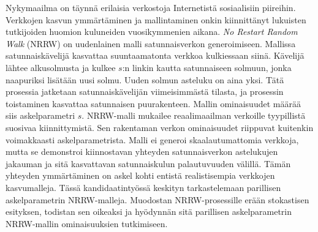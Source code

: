 \documentclass[finnish, 12pt, a4paper, sci, utf8, pdfa]{aaltothesis}
\date{12.5.2018}
\begin{document}
	
\makecoverpage

\makecopyrightpage

\begin{abstractpage}[finnish]
Nykymaailma on täynnä erilaisia verkostoja Internetistä sosiaalisiin piireihin. Verkkojen kasvun ymmärtäminen ja mallintaminen
onkin kiinnittänyt lukuisten tutkijoiden huomion kuluneiden vuosikymmenien aikana.
\textit{No Restart Random Walk} (NRRW) on uudenlainen malli satunnaisverkon generoimiseen. Mallissa satunnaiskävelijä kasvattaa suuntaamatonta verkkoa 
kulkiessaan siinä. Kävelijä lähtee alkusolmusta ja kulkee $ s $:n linkin kautta satunnaiseen solmuun, jonka naapuriksi lisätään 
uusi solmu. Uuden solmun asteluku on aina yksi. Tätä prosessia jatketaan satunnaiskävelijän viimeisimmästä tilasta, ja prosessin 
toistaminen kasvattaa satunnaisen puurakenteen. Mallin ominaisuudet määrää siis askelparametri $ s $. 
NRRW-malli mukailee reaalimaailman verkoille tyypillistä suosivaa kiinnittymistä. Sen rakentaman verkon ominaisuudet riippuvat 
kuitenkin voimakkaasti askelparametrista. Malli ei generoi skaalautumattomia verkkoja, mutta se demonstroi kiinnostavan yhteyden 
satunnaisverkon astelukujen jakauman ja sitä kasvattavan satunnaiskulun palautuvuuden välillä. Tämän yhteyden ymmärtäminen on askel 
kohti entistä realistisempia verkkojen kasvumalleja. Tässä kandidaatintyössä keskityn tarkastelemaan parillisen askelparametrin 
NRRW-malleja. Muodostan NRRW-prosessille erään stokastisen esityksen, todistan sen oikeaksi ja hyödynnän sitä parillisen askelparametrin 
NRRW-mallin ominaisuuksien tutkimiseen.
\end{abstractpage}

\end{document}
